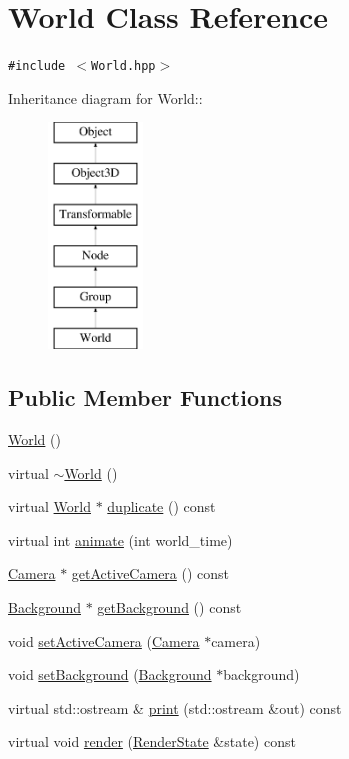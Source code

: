\hypertarget{classm3g_1_1World}{
\section{World Class Reference}
\label{classm3g_1_1World}
}
{\tt \#include $<$World.hpp$>$}

Inheritance diagram for World::\begin{figure}[H]
\begin{center}
\leavevmode
\includegraphics[height=6cm]{classm3g_1_1World}
\end{center}
\end{figure}
\subsection*{Public Member Functions}
\begin{CompactItemize}
\item 
\hyperlink{classm3g_1_1World_75e827b8787e735882f60c266d58e02e}{World} ()
\item 
virtual \hyperlink{classm3g_1_1World_bd170ded455f0b2273c1fe06da6ea0cb}{$\sim$World} ()
\item 
virtual \hyperlink{classm3g_1_1World}{World} $\ast$ \hyperlink{classm3g_1_1World_efde97aaf753d48fff769d9011f187f2}{duplicate} () const 
\item 
virtual int \hyperlink{classm3g_1_1World_8aad1ceab4c2a03609c8a42324ce484d}{animate} (int world\_\-time)
\item 
\hyperlink{classm3g_1_1Camera}{Camera} $\ast$ \hyperlink{classm3g_1_1World_812e01ec4fd0fd872b0ca5ea6a30b2f6}{getActiveCamera} () const 
\item 
\hyperlink{classm3g_1_1Background}{Background} $\ast$ \hyperlink{classm3g_1_1World_fb10ab7fd2ad14b7b1d49caf129670e0}{getBackground} () const 
\item 
void \hyperlink{classm3g_1_1World_dd9a82b335e8521592ad410c662a5cfd}{setActiveCamera} (\hyperlink{classm3g_1_1Camera}{Camera} $\ast$camera)
\item 
void \hyperlink{classm3g_1_1World_6193765c76d6dc0450f264918ebe7e1c}{setBackground} (\hyperlink{classm3g_1_1Background}{Background} $\ast$background)
\item 
virtual std::ostream \& \hyperlink{classm3g_1_1World_6fea17fa1532df3794f8cb39cb4f911f}{print} (std::ostream \&out) const 
\item 
virtual void \hyperlink{classm3g_1_1World_8babc8a79b78615da51161e94029eea9}{render} (\hyperlink{structm3g_1_1RenderState}{RenderState} \&state) const 
\end{CompactItemize}


